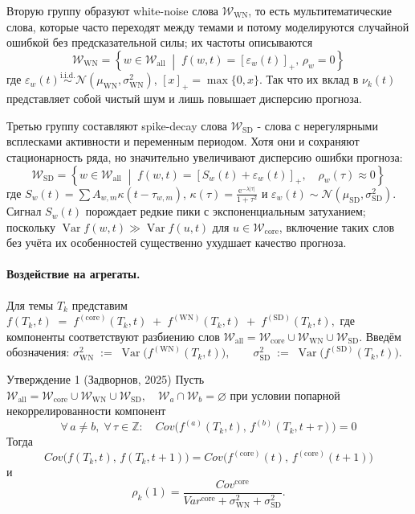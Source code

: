 \documentclass[14pt,a4paper]{article}
\begin{document}
Вторую группу образуют white-noise слова $\mathcal{W}_{\mathrm{WN}}$, то есть мультитематические слова, которые часто переходят между темами и потому моделируются случайной ошибкой без предсказательной силы; их частоты описываются
\[
\mathcal{W}_{\mathrm{WN}} = \left\{ w \in \mathcal{W}_{\mathrm{all}} \;\middle|\; f(w,t) = [\varepsilon_w(t)]_+,\, \rho_w = 0 \right\}
\]
где $\varepsilon_w(t)\overset{\text{i.i.d.}}{\sim}\mathcal N(\mu_{\mathrm{WN}},\sigma_{\mathrm{WN}}^{2})$, $[x]_+=\max\{0,x\}$.
Так что их вклад в $\nu_k(t)$ представляет собой чистый шум и лишь повышает дисперсию прогноза. 

Третью группу составляют spike-decay слова $\mathcal{W}_{\mathrm{SD}}$ - слова с нерегулярными всплесками активности и переменным периодом. Хотя они и сохраняют стационарность ряда, но значительно увеличивают дисперсию ошибки прогноза: 
\[
\mathcal{W}_{\mathrm{SD}} = \left\{ w \in \mathcal{W}_{\mathrm{all}} \;\middle|\; f(w,t) = [S_w(t) + \varepsilon_w(t)]_+, \quad \rho_w(\tau) \approx 0\right\}
\]
где $S_w(t) = \textstyle\sum A_{w,m} \kappa(t{-}\tau_{w,m})$, $\kappa(\tau)=\frac{\mathrm e^{-\lambda|\tau|}}{1+\tau^{2}}$ и $\varepsilon_w(t)\sim\mathcal N(\mu_{\mathrm{SD}},\sigma_{\mathrm{SD}}^{2})$. Сигнал $S_w(t)$ порождает редкие пики с экспоненциальным затуханием; поскольку $\operatorname{Var}f(w,t)\gg \operatorname{Var}f(u,t)$ для $u\in\mathcal{W}_{\mathrm{core}}$, включение таких слов без учёта их особенностей существенно ухудшает качество прогноза.


\paragraph{Воздействие на агрегаты.}  
Для темы \(T_k\) представим
\(
  f(T_k,t)
  \;=\;
  f^{(\mathrm{core})}(T_k,t)
  \;+\;
  f^{(\mathrm{WN})}(T_k,t)
  \;+\;
  f^{(\mathrm{SD})}(T_k,t),
\)
где компоненты соответствуют разбиению слов \(\mathcal{W}_{\mathrm{all}} = \mathcal{W}_{\mathrm{core}} \cup \mathcal{W}_{\mathrm{WN}} \cup \mathcal{W}_{\mathrm{SD}}\). 
Введём обозначения:
\(
  \sigma_{\mathrm{WN}}^{2} \;:=\; \operatorname{Var}\bigl(f^{(\mathrm{WN})}(T_k,t)\bigr),
  \qquad
  \sigma_{\mathrm{SD}}^{2} \;:=\; \operatorname{Var}\bigl(f^{(\mathrm{SD})}(T_k,t)\bigr).
\)

\begin{theorem}{Утверждение 1 (Задворнов, 2025)}
Пусть \(
\mathcal{W}_{\mathrm{all}} = \mathcal{W}_{\mathrm{core}} \cup \mathcal{W}_{\mathrm{WN}} \cup \mathcal{W}_{\mathrm{SD}}, \quad \mathcal{W}_a \cap \mathcal{W}_b = \varnothing
\)
при условии попарной некоррелированности компонент
\[
\forall\,a \neq b,\;\forall\,\tau \in \mathbb{Z}:\quad
Cov\bigl(f^{(a)}(T_k,t),\,f^{(b)}(T_k,t+\tau)\bigr) = 0
\]
Тогда
\[
Cov\bigl(f(T_k,t),\,f(T_k,t+1)\bigr) = Cov\bigl(f^{(\mathrm{core})}(t),\,f^{(\mathrm{core})}(t{+}1)\bigr)
\]
и
\[
\rho_k(1) = \frac{Cov^{\mathrm{core}}}{Var^{\mathrm{core}} + \sigma_{\mathrm{WN}}^2 + \sigma_{\mathrm{SD}}^2}.
\]
\end{theorem}
\end{document}

